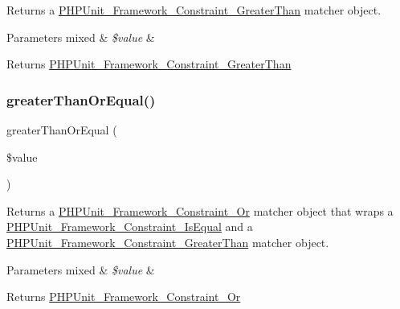 Returns a \mbox{\hyperlink{class_p_h_p_unit___framework___constraint___greater_than}{P\+H\+P\+Unit\+\_\+\+Framework\+\_\+\+Constraint\+\_\+\+Greater\+Than}} matcher object.


\begin{DoxyParams}[1]{Parameters}
mixed & {\em \$value} & \\
\hline
\end{DoxyParams}
\begin{DoxyReturn}{Returns}
\mbox{\hyperlink{class_p_h_p_unit___framework___constraint___greater_than}{P\+H\+P\+Unit\+\_\+\+Framework\+\_\+\+Constraint\+\_\+\+Greater\+Than}} 
\end{DoxyReturn}
\mbox{\label{_functions_8php_ada4f837a9d31e0594303d561ea82682e}} 
\subsubsection{\texorpdfstring{greater\+Than\+Or\+Equal()}{greaterThanOrEqual()}}
{\footnotesize\ttfamily greater\+Than\+Or\+Equal (\begin{DoxyParamCaption}\item[{}]{\$value }\end{DoxyParamCaption})}

Returns a \mbox{\hyperlink{class_p_h_p_unit___framework___constraint___or}{P\+H\+P\+Unit\+\_\+\+Framework\+\_\+\+Constraint\+\_\+\+Or}} matcher object that wraps a \mbox{\hyperlink{class_p_h_p_unit___framework___constraint___is_equal}{P\+H\+P\+Unit\+\_\+\+Framework\+\_\+\+Constraint\+\_\+\+Is\+Equal}} and a \mbox{\hyperlink{class_p_h_p_unit___framework___constraint___greater_than}{P\+H\+P\+Unit\+\_\+\+Framework\+\_\+\+Constraint\+\_\+\+Greater\+Than}} matcher object.


\begin{DoxyParams}[1]{Parameters}
mixed & {\em \$value} & \\
\hline
\end{DoxyParams}
\begin{DoxyReturn}{Returns}
\mbox{\hyperlink{class_p_h_p_unit___framework___constraint___or}{P\+H\+P\+Unit\+\_\+\+Framework\+\_\+\+Constraint\+\_\+\+Or}} 
\end{DoxyReturn}
\mbox{\label{_functions_8php_a336a6ba8bc724c0227c728093efe2b84}} 
